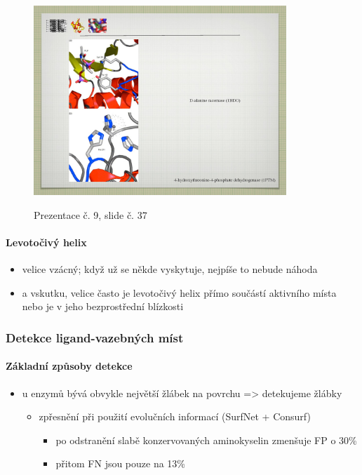 \documentclass[DIV=8]{scrreprt}
\begin{document}
\begin{figure}
    \caption{Prezentace č. 9, slide č. 37}
    \includegraphics[width=0.85\textwidth]{slides-9/slide-37.jpg}
    \centering
    \label{slides-9-slide-37}
\end{figure}

\paragraph{Levotočivý helix}
\begin{itemize}[nosep]
    \item velice vzácný; když už se někde vyskytuje, nejpíše to nebude náhoda
    \item a vskutku, velice často je levotočivý helix přímo součástí aktivního místa nebo je v jeho bezprostřední blízkosti
\end{itemize}



\subsubsection{Detekce ligand-vazebných míst} \label{Detekce ligand-vazebných míst}


\paragraph{Základní způsoby detekce}
\begin{itemize}[nosep]
    \item u enzymů bývá obvykle největší žlábek na povrchu => detekujeme žlábky
\begin{itemize}[nosep]
    \item zpřesnění při použití evolučních informací (SurfNet + Consurf)
\begin{itemize}[nosep]
    \item po odstranění slabě konzervovaných aminokyselin zmenšuje FP o 30\%
    \item přitom FN jsou pouze na 13\%
\end{itemize}

\end{itemize}

\end{itemize}
\end{document}
